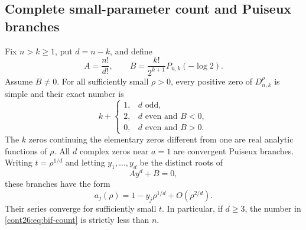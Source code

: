 \subsection{Complete small-parameter count and Puiseux branches}

\begin{theorem}
\label{cont26:thm:bif-small-rho}
Fix $n>k\geq1$, put $d=n-k$, and define
\begin{equation}\label{cont26:eq:bif-constants}
 A=\frac{n!}{d!},\qquad
 B=\frac{k!}{2^{k+1}}P_{n,k}(-\log2).
\end{equation}
Assume $B\ne0$. For all sufficiently small $\rho>0$, every positive
zero of $D_{n,k}^{\rho}$ is simple and their exact number is
\begin{equation}\label{cont26:eq:bif-count}
 k+\begin{cases}
 1,&d\text{ odd},\\
 2,&d\text{ even and }B<0,\\
 0,&d\text{ even and }B>0.
 \end{cases}
\end{equation}
The $k$ zeros continuing the elementary zeros different from one are
real analytic functions of $\rho$. All $d$ complex zeros near $a=1$
are convergent Puiseux branches. Writing $t=\rho^{1/d}$ and letting
$y_1,\ldots,y_d$ be the distinct roots of
\begin{equation}\label{cont26:eq:bif-leading-equation}
 A y^d+B=0,
\end{equation}
these branches have the form
\begin{equation}\label{cont26:eq:bif-puiseux}
 a_j(\rho)=1-y_j\rho^{1/d}+O(\rho^{2/d}).
\end{equation}
Their series converge for sufficiently small $t$. In particular,
if $d\geq3$, the number in \eqref{cont26:eq:bif-count} is strictly less than $n$.
\end{theorem}
